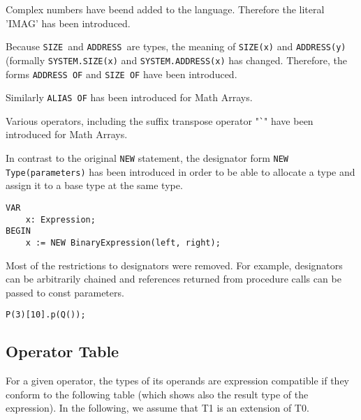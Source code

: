 \documentclass[a4wide,11pt]{article}
\newcommand{\ADDRESS}{\lstinline"ADDRESS"}
\newcommand{\SIZE}{\lstinline"SIZE"}
\begin{document}
\begin{annotation}
Complex numbers have beend added to the language.
Therefore the literal 'IMAG' has been introduced.

Because \SIZE\ and \ADDRESS\ are types, the meaning of \lstinline"SIZE(x)" and \lstinline"ADDRESS(y)" (formally \lstinline"SYSTEM.SIZE(x)" and \lstinline"SYSTEM.ADDRESS(x)" has changed.
Therefore, the forms \lstinline"ADDRESS OF" and \lstinline"SIZE OF" have been introduced.

Similarly \lstinline"ALIAS OF" has been introduced for Math Arrays.

Various operators, including the suffix transpose operator "\lstinline~`~" have been introduced for Math Arrays.


In contrast to the original \lstinline"NEW" statement, the designator form \lstinline"NEW Type(parameters)" has been introduced in order to be able to allocate a type and assign it to a base type at the same type.
\begin{lstlisting}[style=example]
VAR
	x: Expression;
BEGIN
	x := NEW BinaryExpression(left, right);
\end{lstlisting}

Most of the restrictions to designators were removed.
For example, designators can be arbitrarily chained and references returned from procedure calls can be passed to const parameters.

\begin{lstlisting}[style=example, caption=Example of a syntactially valid designator]
	P(3)[10].p(Q());
\end{lstlisting}

\end{annotation}


\subsection{Operator Table}\label{section:OperatoTable}
For a given operator, the types of its operands are expression compatible if they conform to the following table (which shows also the result type of the expression).
In the following, we assume that T1 is an extension of T0.
\end{document}
